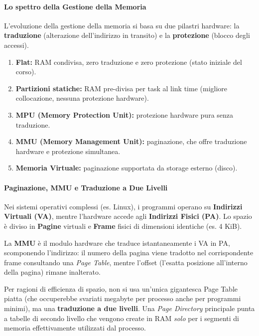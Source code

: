 \paragraph*{Lo spettro della Gestione della Memoria}
L'evoluzione della gestione della memoria si basa su due pilastri hardware: la \textbf{traduzione} (alterazione dell'indirizzo in transito) e la \textbf{protezione} (blocco degli accessi).
\begin{enumerate}
    \item \textbf{Flat:} RAM condivisa, zero traduzione e zero protezione (stato iniziale del corso).
    \item \textbf{Partizioni statiche:} RAM pre-divisa per task al link time (migliore collocazione, nessuna protezione hardware).
    \item \textbf{MPU (Memory Protection Unit):} protezione hardware pura senza traduzione.
    \item \textbf{MMU (Memory Management Unit):} paginazione, che offre traduzione hardware e protezione simultanea.
    \item \textbf{Memoria Virtuale:} paginazione supportata da storage esterno (disco).
\end{enumerate}

\paragraph*{Paginazione, MMU e Traduzione a Due Livelli}
Nei sistemi operativi complessi (es. Linux), i programmi operano su \textbf{Indirizzi Virtuali (VA)}, mentre l'hardware accede agli \textbf{Indirizzi Fisici (PA)}. Lo spazio è diviso in \textbf{Pagine} virtuali e \textbf{Frame} fisici di dimensioni identiche (es. 4 KiB).

La \textbf{MMU} è il modulo hardware che traduce istantaneamente i VA in PA, scomponendo l'indirizzo: il numero della pagina viene tradotto nel corrispondente frame consultando una \emph{Page Table}, mentre l'offset (l'esatta posizione all'interno della pagina) rimane inalterato.

Per ragioni di efficienza di spazio, non si usa un'unica gigantesca Page Table piatta (che occuperebbe svariati megabyte per processo anche per programmi minimi), ma una \textbf{traduzione a due livelli}. Una \emph{Page Directory} principale punta a tabelle di secondo livello che vengono create in RAM \emph{solo} per i segmenti di memoria effettivamente utilizzati dal processo.


